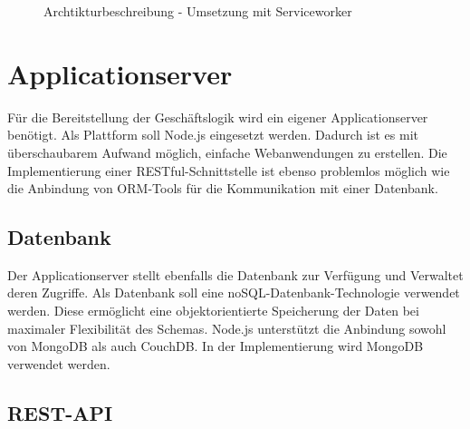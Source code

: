 \begin{figure}[htp] 
\caption{Archtikturbeschreibung - Umsetzung mit Serviceworker}
\label{image_architektur-serviceworker-push}
\end{figure} 

\newpage
\section{Applicationserver}
\label{sec_konzeption_applicationserver}

Für die Bereitstellung der Geschäftslogik wird ein eigener Applicationserver benötigt. Als Plattform soll Node.js eingesetzt werden. Dadurch ist es mit überschaubarem Aufwand möglich, einfache Webanwendungen zu erstellen. Die Implementierung einer RESTful-Schnittstelle ist ebenso problemlos möglich wie die Anbindung von ORM-Tools für die Kommunikation mit einer Datenbank. 

\subsection{Datenbank}

Der Applicationserver stellt ebenfalls die Datenbank zur Verfügung und Verwaltet deren Zugriffe. Als Datenbank soll eine noSQL-Datenbank-Technologie verwendet werden. Diese ermöglicht eine objektorientierte Speicherung der Daten bei maximaler Flexibilität des Schemas. Node.js unterstützt die Anbindung sowohl von MongoDB als auch CouchDB. In der Implementierung wird MongoDB verwendet werden.

\subsection{REST-API}
\label{subsec_konzeption_rest-api}

